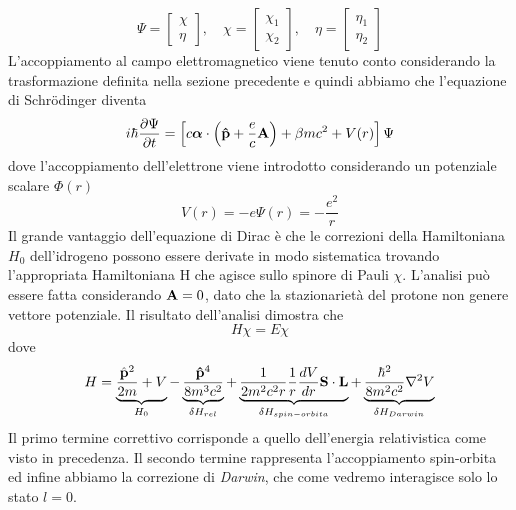 \begin{equation*}
	\Psi = \left [ \begin{array}{c}
		\chi \\ \eta 
	\end{array}\right]
	,\quad
	\chi = \left [ \begin{array}{c}
		\chi_1 \\ \chi_2 
	\end{array}\right]
	 ,\quad
	 \eta = \left [ \begin{array}{c}
		\eta_1 \\ \eta_2 
	\end{array}\right]
\end{equation*}
L'accoppiamento al campo elettromagnetico viene tenuto conto considerando la trasformazione definita nella sezione precedente e quindi abbiamo che l'equazione di Schr\"odinger diventa
\begin{equation*}
	i \hbar \frac{\partial \Psi}{\partial t} = \left [ c \boldsymbol{\alpha} \cdot \left ( \bold{\hat{p}} + \frac{e}{c}\bold{A}\right) + \beta mc^2 + V(r) \right]\Psi
\end{equation*}
dove l'accoppiamento dell'elettrone viene introdotto considerando un potenziale scalare $\Phi(r)$
\begin{equation*}
	V(r) = - e \Psi(r) =- \frac{e^2}{r}
\end{equation*}
Il grande vantaggio dell'equazione di Dirac \`e che le correzioni della Hamiltoniana $H_0$ dell'idrogeno possono essere derivate in modo sistematica trovando l'appropriata Hamiltoniana H che agisce sullo spinore di Pauli $\chi$. L'analisi pu\`o essere fatta considerando $\bold{A} = 0$, dato che la stazionariet\`a del protone non genere vettore potenziale. Il risultato dell'analisi dimostra che 
\begin{equation*}
	H \chi = E \chi
\end{equation*} 
dove 
\begin{equation}
	H = \underbrace{ \frac{\hat{\bold{p}}^2}{2m} + V}_{H_0} - \underbrace{\frac{\bold{\hat{p}}^4}{8m^3c^2}}_{\delta H_{rel}} + \underbrace{\frac{1}{2m^2c^2r} \frac{1}{r} \frac{dV}{dr} \bold{S} \cdot \bold{L}}_{\delta H_{spin-orbita}} + \underbrace{\frac{\hbar^2}{8m^2c^2}\nabla^2 V}_{\delta H_{Darwin}}
\end{equation}
Il primo termine correttivo corrisponde a quello dell'energia relativistica come visto in precedenza. Il secondo termine rappresenta l'accoppiamento spin-orbita ed infine abbiamo la correzione di \textit{Darwin}, che come vedremo interagisce solo lo stato $l = 0$.

